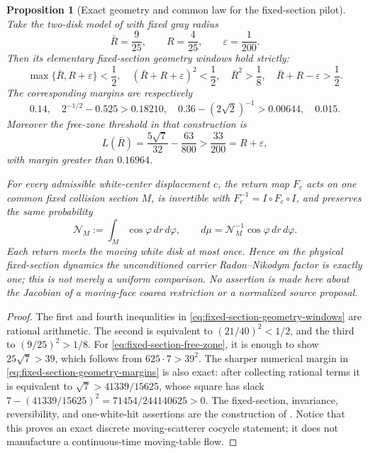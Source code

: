 \documentclass[11pt]{article}
\newtheorem{proposition}[theorem]{Proposition}
\begin{document}
\begin{proposition}[Exact geometry and common law for the fixed-section pilot]
\label{prop:fixed-section-exact-geometry}
Take the two-disk model of \cite{StenlundRandom} with fixed gray radius
\begin{equation}
 \bar R=\frac9{25},\qquad R=\frac4{25},\qquad
 \varepsilon=\frac1{200}.
\label{eq:fixed-section-rational-data}
\end{equation}
Then its elementary fixed-section geometry windows hold strictly:
\begin{equation}
\label{eq:fixed-section-geometry-windows}
 \max\{\bar R,R+\varepsilon\}<\frac12,
 \quad (\bar R+R+\varepsilon)^2<\frac12,
 \quad \bar R^2>\frac18,
 \quad \bar R+R-\varepsilon>\frac12.
\end{equation}
The corresponding margins are respectively
\begin{equation}
\label{eq:fixed-section-geometry-margins}
 0.14,\quad
 2^{-1/2}-0.525>0.18210,\quad
 0.36-(2\sqrt2)^{-1}>0.00644,\quad
 0.015.
\end{equation}
Moreover the free-zone threshold in that construction is
\begin{equation}
 L(\bar R)=\frac{5\sqrt7}{32}-\frac{63}{800}>\frac{33}{200}
 =R+\varepsilon,
\label{eq:fixed-section-free-zone}
\end{equation}
with margin greater than $0.16964$.

For every admissible white-center displacement $c$, the return map $F_c$
acts on one common fixed collision section $M$, is invertible with
$F_c^{-1}=I\circ F_c\circ I$, and preserves the same probability
\begin{equation}
 \mathcal N_M:=\int_M\cos\varphi\,dr\,d\varphi,
 \qquad
 d\mu=\mathcal N_M^{-1}\cos\varphi\,dr\,d\varphi.
\label{eq:fixed-section-common-law}
\end{equation}
Each return meets the moving white disk at most once.  Hence on the physical
fixed-section dynamics the unconditioned carrier Radon--Nikodym factor is
exactly one; this is not merely a uniform comparison.  No assertion is made
here about the Jacobian of a moving-face coarea restriction or a normalized
source proposal.
\end{proposition}

\begin{proof}
The first and fourth inequalities in
\eqref{eq:fixed-section-geometry-windows} are rational arithmetic.  The
second is equivalent to $(21/40)^2<1/2$, and the third to
$(9/25)^2>1/8$.  For \eqref{eq:fixed-section-free-zone}, it is enough to
show $25\sqrt7>39$, which follows from $625\cdot7>39^2$.
The sharper numerical margin in \eqref{eq:fixed-section-geometry-margins}
is also exact: after collecting rational terms it is equivalent to
$\sqrt7>41339/15625$, whose square has slack
$7-(41339/15625)^2=71454/244140625>0$.
The fixed-section,
invariance, reversibility, and one-white-hit assertions are the construction
of \cite[Sections~2.1--2.4]{StenlundRandom}.  Notice that this proves an
exact discrete moving-scatterer cocycle statement; it does not manufacture
a continuous-time moving-table flow.
\end{proof}
\end{document}
